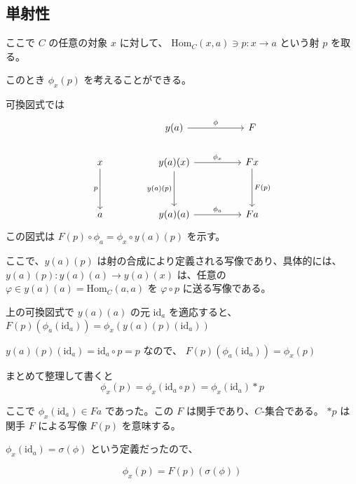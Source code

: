 \documentclass[uplatex,a4j,12pt,dvipdfmx]{jsarticle}
\begin{document}
\subsection{単射性}

ここで $C$ の任意の対象 $x$ に対して、
$\text{Hom}_{C}(x,a) \ni p: x \to a$ という射 $p$ を取る。

このとき $\phi_{x}(p)$ を考えることができる。

可換図式では
\[
	\begin{tikzcd}
		&  & y(a) \arrow[rr, "\phi"]                               &  & F                     \\
		x \arrow[dd, "p"'] &  & y(a)(x) \arrow[dd, "y(a)(p)"'] \arrow[rr, "\phi_{x}"] &  & Fx \arrow[dd, "F(p)"] \\
		&  &                                                       &  &                       \\
		a                  &  & y(a)(a) \arrow[rr, "\phi_{a}"]                        &  & Fa
	\end{tikzcd}
\]
この図式は $F(p) \circ \phi_{a} = \phi_{x} \circ y(a)(p)$ を示す。

ここで、$y(a)(p)$ は射の合成により定義される写像であり、具体的には、
$y(a)(p): y(a)(a) \to y(a)(x)$ は、任意の$\varphi \in y(a)(a) = \text{Hom}_{C}(a,a)$ を
$\varphi \circ p$ に送る写像である。

上の可換図式で $y(a)(a)$ の元 id$_{a}$ を適応すると、
$F(p)(\phi_{a}(\text{id}_{a})) = \phi_{x}(y(a)(p)(\text{id}_{a}))$

$y(a)(p)(\text{id}_{a}) = \text{id}_{a} \circ p = p$ なので、
$F(p)(\phi_{a}(\text{id}_{a})) = \phi_{x}(p)$

まとめて整理して書くと
\[
	\phi_{x}(p) = \phi_{x}( \text{id}_{a} \circ p) = \phi_{x}( \text{id}_{a} ) * p
\]

ここで $\phi_{x}( \text{id}_{a} ) \in Fa$ であった。この $F$ は関手であり、$C$-集合である。
$*p$ は 関手 $F$ による写像 $F(p)$ を意味する。

$\phi_{x}( \text{id}_{a} ) = \sigma(\phi)$ という定義だったので、

\[
	\phi_{x}(p) = F(p)(\sigma(\phi))
\]
\end{document}
